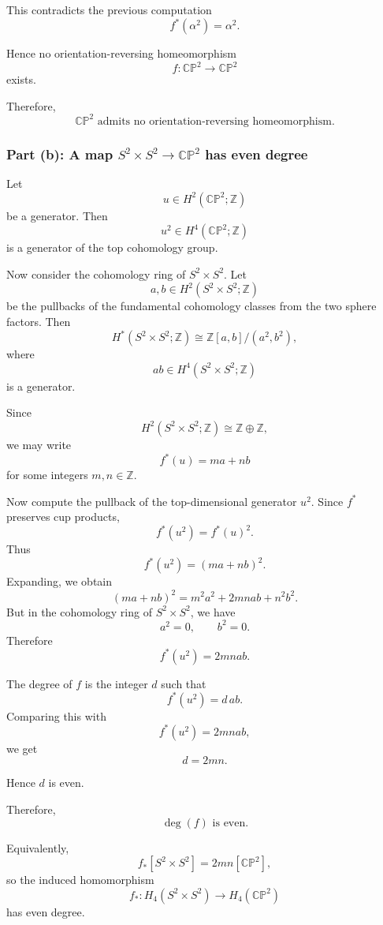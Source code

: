 \begin{solution}
This contradicts the previous computation
\[
f^{*}(\alpha^{2})=\alpha^{2}.
\]

Hence no orientation-reversing homeomorphism
\[
f:\mathbb{CP}^{2}\longrightarrow \mathbb{CP}^{2}
\]
exists.

Therefore,
\[
\boxed{\mathbb{CP}^{2}\text{ admits no orientation-reversing homeomorphism.}}
\]

\subsubsection*{Part (b): A map \texorpdfstring{$S^{2}\times S^{2}\to \mathbb{CP}^{2}$}{S2 x S2 to CP2} has even degree}

Let
\[
u\in H^{2}(\mathbb{CP}^{2};\mathbb{Z})
\]
be a generator. Then
\[
u^{2}\in H^{4}(\mathbb{CP}^{2};\mathbb{Z})
\]
is a generator of the top cohomology group.

Now consider the cohomology ring of \(S^{2}\times S^{2}\). Let
\[
a,b\in H^{2}(S^{2}\times S^{2};\mathbb{Z})
\]
be the pullbacks of the fundamental cohomology classes from the two sphere factors. Then
\[
H^{*}(S^{2}\times S^{2};\mathbb{Z})
\cong
\mathbb{Z}[a,b]/(a^{2},b^{2}),
\]
where
\[
ab\in H^{4}(S^{2}\times S^{2};\mathbb{Z})
\]
is a generator.

Since
\[
H^{2}(S^{2}\times S^{2};\mathbb{Z})
\cong
\mathbb{Z}\oplus \mathbb{Z},
\]
we may write
\[
f^{*}(u)=ma+nb
\]
for some integers \(m,n\in\mathbb{Z}\).

Now compute the pullback of the top-dimensional generator \(u^{2}\). Since \(f^{*}\) preserves cup products,
\[
f^{*}(u^{2})
=
f^{*}(u)^2.
\]
Thus
\[
f^{*}(u^{2})
=
(ma+nb)^2.
\]
Expanding, we obtain
\[
(ma+nb)^2
=
m^{2}a^{2}+2mnab+n^{2}b^{2}.
\]
But in the cohomology ring of \(S^{2}\times S^{2}\), we have
\[
a^{2}=0,
\qquad
b^{2}=0.
\]
Therefore
\[
f^{*}(u^{2})=2mnab.
\]

The degree of \(f\) is the integer \(d\) such that
\[
f^{*}(u^{2})=d\,ab.
\]
Comparing this with
\[
f^{*}(u^{2})=2mnab,
\]
we get
\[
d=2mn.
\]

Hence \(d\) is even.

Therefore,
\[
\boxed{\deg(f)\text{ is even.}}
\]

Equivalently,
\[
f_{*}[S^{2}\times S^{2}]
=
2mn[\mathbb{CP}^{2}],
\]
so the induced homomorphism
\[
f_{*}:H_{4}(S^{2}\times S^{2})
\longrightarrow
H_{4}(\mathbb{CP}^{2})
\]
has even degree.
\end{solution}

